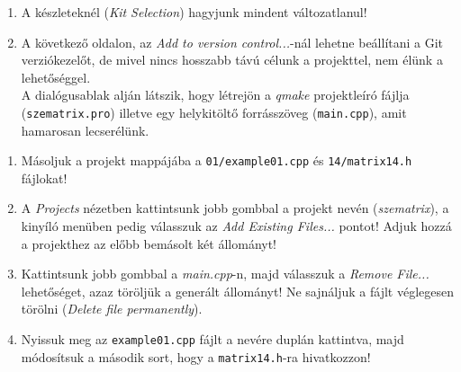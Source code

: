 \begin{frame}
  \begin{enumerate}
    \setcounter{enumi}{\theqt}
    \item A készleteknél (\emph{Kit Selection}) hagyjunk mindent változatlanul!
    \item A következő oldalon, az \emph{Add to version control...}-nál lehetne beállítani a Git verziókezelőt, de mivel nincs hosszabb távú célunk a projekttel, nem élünk a lehetőséggel.\\
    A dialógusablak alján látszik, hogy létrejön a \emph{qmake} projektleíró fájlja (\texttt{szematrix.pro}) illetve egy helykitöltő forrásszöveg (\texttt{main.cpp}), amit hamarosan lecserélünk.\\
    \setcounter{qt}{\theenumi}
  \end{enumerate}
\end{frame}

\begin{frame}
  \begin{enumerate}
    \setcounter{enumi}{\theqt}
    \item Másoljuk a projekt mappájába a \texttt{01/example01.cpp} és \texttt{14/matrix14.h} fájlokat!
    \item A \emph{Projects} nézetben kattintsunk jobb gombbal a projekt nevén (\emph{szematrix}), a kinyíló menüben pedig válasszuk az \emph{Add Existing Files...} pontot! Adjuk hozzá a projekthez az előbb bemásolt két állományt!
    \item Kattintsunk jobb gombbal a \emph{main.cpp}-n, majd válasszuk a \emph{Remove File...} lehetőséget, azaz töröljük a generált állományt! Ne sajnáljuk a fájlt véglegesen törölni (\emph{Delete file permanently}).
    \item Nyissuk meg az \texttt{example01.cpp} fájlt a nevére duplán kattintva, majd módosítsuk a második sort, hogy a \texttt{matrix14.h}-ra hivatkozzon!
    \setcounter{qt}{\theenumi}
  \end{enumerate}
\end{frame}

